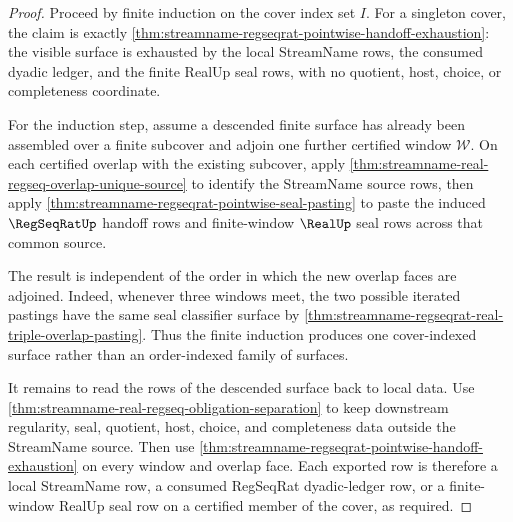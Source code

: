 \begin{proof}
Proceed by finite induction on the cover index set $I$. For a singleton
cover, the claim is exactly
\autoref{thm:streamname-regseqrat-pointwise-handoff-exhaustion}: the visible
surface is exhausted by the local StreamName rows, the consumed dyadic ledger,
and the finite RealUp seal rows, with no quotient, host, choice, or
completeness coordinate.

For the induction step, assume a descended finite surface has already been
assembled over a finite subcover and adjoin one further certified window
$\mathcal{W}$. On each certified overlap with the existing subcover, apply
\autoref{thm:streamname-real-regseq-overlap-unique-source} to identify the
StreamName source rows, then apply
\autoref{thm:streamname-regseqrat-pointwise-seal-pasting} to paste the
induced $\RegSeqRatUp$ handoff rows and finite-window $\RealUp$ seal rows
across that common source.

The result is independent of the order in which the new overlap faces are
adjoined. Indeed, whenever three windows meet, the two possible iterated
pastings have the same seal classifier surface by
\autoref{thm:streamname-regseqrat-real-triple-overlap-pasting}. Thus the
finite induction produces one cover-indexed surface rather than an
order-indexed family of surfaces.

It remains to read the rows of the descended surface back to local data. Use
\autoref{thm:streamname-real-regseq-obligation-separation} to keep downstream
regularity, seal, quotient, host, choice, and completeness data outside the
StreamName source. Then use
\autoref{thm:streamname-regseqrat-pointwise-handoff-exhaustion} on every
window and overlap face. Each exported row is therefore a local StreamName
row, a consumed RegSeqRat dyadic-ledger row, or a finite-window RealUp seal
row on a certified member of the cover, as required.
\end{proof}

